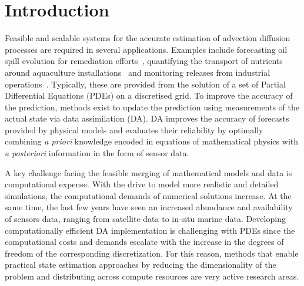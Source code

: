 \documentclass[acmsmall,review,anonymous]{acmart}\settopmatter{printfolios=true,printccs=false,printacmref=false}
\begin{document}


\maketitle

\section{Introduction}

Feasible and scalable systems for the accurate estimation of advection diffusion processes are required in several applications. Examples include forecasting oil spill evolution for remediation efforts~\cite{guo2009modeling}, quantifying the transport of nutrients around aquaculture installations~\cite{odonncha2013physical} and monitoring releases from industrial operations~\cite{koziy1998three}.  Typically, these are provided from the solution of a set of Partial Differential Equations (PDEs) on a discretised grid. To improve the accuracy of the prediction, methods exist to update the prediction using measurements of the actual state via data assimilation (DA). DA improves the accuracy of forecasts provided by physical models and evaluates their reliability by optimally combining \emph{a priori} knowledge encoded in equations of mathematical physics with \emph{a posteriori} information in the form of sensor data. 

A key challenge facing the feasible merging of mathematical models and data is computational expense. With the drive to model more realistic and detailed simulations, the computational demands of numerical solutions increase. At the same time, the last few years have seen an increased abundance and availability of sensors data, ranging from satellite data to in-situ marine data. Developing computationally efficient DA implementation is challenging with PDEs since the computational costs and demands escalate with the increase in the degrees of freedom of the corresponding discretization. For this reason, methods that enable practical state estimation approaches by reducing the dimensionality of the problem and distributing across compute resources are very active research areas. 
\end{document}
